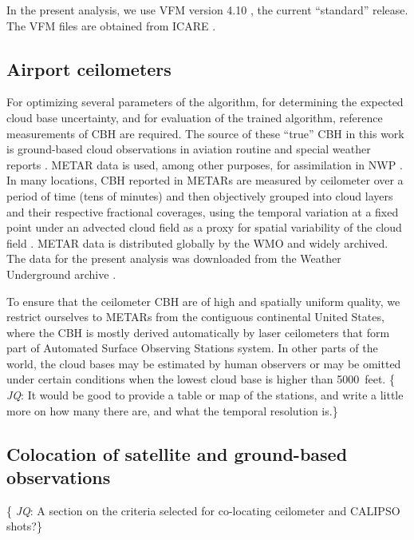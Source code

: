 \documentclass[essd,manuscript]{copernicus}\usepackage[]{graphicx}\usepackage[]{color}
\newcommand{\hlnum}[1]{\textcolor[rgb]{0.686,0.059,0.569}{#1}}%
\newcommand\comment[2]{\{\hlnum{ \textit{#1}: #2}\}}
\newcommand\commentjm[1]{\comment{$j_\mu$}{#1}}
\begin{document}
In the present analysis, we use VFM version 4.10 \citep{vfm}, the current
``standard'' release.  The VFM files are obtained from ICARE \citep{icare}.

\subsection{Airport ceilometers}

For optimizing several parameters of the algorithm, for determining the expected
cloud base uncertainty, and for evaluation of the trained algorithm, reference
measurements of CBH are required.  The source of these ``true'' CBH in this work is
ground-based cloud observations in aviation routine and special weather reports
\citep[METARs and SPECIs, collectively referred to as METARs
henceforth][]{metar}.  METAR data is used, among other purposes, for assimilation
in NWP \citep[e.g.,][]{HRRR, IFS}.  In many locations, CBH reported in METARs
are measured by ceilometer over a period of time (tens of minutes) and then
objectively grouped into cloud layers and their respective fractional coverages,
using the temporal variation at a fixed point under an advected cloud field as a
proxy for spatial variability of the cloud field \citep[e.g.,]{heese2010,doi:10.5194/amt-3-1763-2010}.  METAR data is distributed
globally by the WMO and widely archived.  The data for the present analysis was
downloaded from the Weather Underground archive \citep{wunderground}.

To ensure that the ceilometer CBH are of high and spatially uniform quality, we
restrict ourselves to METARs from the contiguous continental United States,
where the CBH is mostly derived automatically by laser ceilometers that form
part of Automated Surface Observing Stations \citep[ASOS][]{asos} system.  In
other parts of the world, the cloud bases may be estimated by human observers or
may be omitted under certain conditions when the lowest cloud base is higher
than 5000~feet.  \comment{JQ}{It would be good to provide a table or map of the
  stations, and write a little more on how many there are, and what the temporal
  resolution is.}

\subsection{Colocation of satellite and ground-based observations}
\comment{JQ}{A section on the criteria selected for co-locating ceilometer and CALIPSO
shots?}
\end{document}
